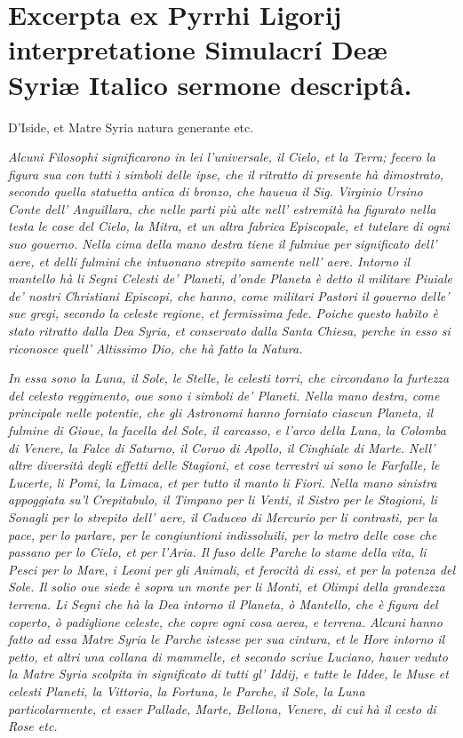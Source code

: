 \documentclass[a4paper, 11pt, oneside, polutonikogreek, latin]{article}
\begin{document}
\section{Excerpta ex Pyrrhi Ligorij interpretatione Simulacrí Deæ Syriæ Italico sermone descriptâ.}

D'Iside, et Matre Syria natura generante etc.

\emph{Alcuni Filosophi significarono in lei l'universale, il Cielo, et la Terra; fecero la figura sua con tutti i simboli delle ipse, che il ritratto di presente hà dimostrato, secondo quella statuetta antica di bronzo, che haueua il Sig. Virginio Ursino Conte dell' Anguillara, che nelle parti più alte nell' estremità ha figurato nella testa le cose del Cielo, la Mitra, et un altra fabrica Episcopale, et tutelare di ogni suo gouerno. Nella cima della mano destra tiene il fulmiue per significato dell' aere, et delli fulmini che intuonano strepito samente nell' aere. Intorno il mantello hà li Segni Celesti de' Planeti, d'onde Planeta è detto il militare Piuiale de' nostri Christiani Episcopi, che hanno, come militari Pastori il gouerno delle' sue gregi, secondo la celeste regione, et fermissima fede. Poiche questo habito è stato ritratto dalla Dea Syria, et conservato dalla Santa Chiesa, perche in esso si riconosce quell' Altissimo Dio, che hà fatto la Natura.}

\emph{In essa sono la Luna, il Sole, le Stelle, le celesti torri, che circondano la furtezza del celesto reggimento, oue sono i simboli de' Planeti. Nella mano destra, come principale nelle potentie, che gli Astronomi hanno forniato ciascun Planeta, il fulmine di Gioue, la facella del Sole, il carcasso, e l'arco della Luna, la Colomba di Venere, la Falce di Saturno, il Coruo di Apollo, il Cinghiale di Marte. Nell' altre diversità degli effetti delle Stagioni, et cose terrestri ui sono le Farfalle, le Lucerte, li Pomi, la Limaca, et per tutto il manto li Fiori. Nella mano sinistra appoggiata su'l Crepitabulo, il Timpano per li Venti, il Sistro per le Stagioni, li Sonagli per lo strepito dell' aere, il Caduceo di Mercurio per li contrasti, per la pace, per lo parlare, per le congiuntioni indissoluili, per lo metro delle cose che passano per lo Cielo, et per l'Aria. Il fuso delle Parche lo stame della vita, li Pesci per lo Mare, i Leoni per gli Animali, et ferocità di essi, et per la potenza del Sole. Il solio oue siede è sopra un monte per li Monti, et Olimpi della grandezza terrena. Li Segni che hà la Dea intorno il Planeta, ò Mantello, che è figura del coperto, ò padiglione celeste, che copre ogni cosa aerea, e terrena. Alcuni hanno fatto ad essa Matre Syria le Parche istesse per sua cintura, et le Hore intorno il petto, et altri una collana di mammelle, et secondo scriue Luciano, hauer veduto la Matre Syria scolpita in significato di tutti gl' Iddij, e tutte le Iddee, le Muse et celesti Planeti, la Vittoria, la Fortuna, le Parche, il Sole, la Luna particolarmente, et esser Pallade, Marte, Bellona, Venere, di cui hà il cesto di Rose etc.}
\end{document}

